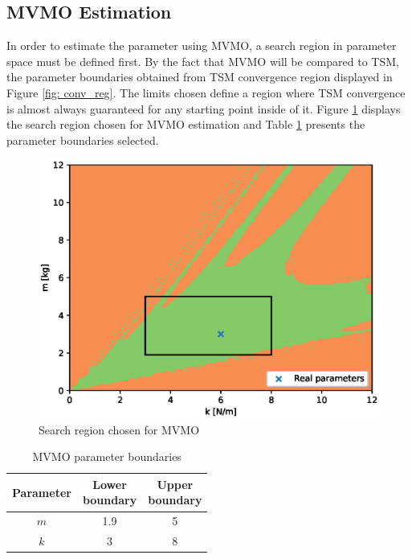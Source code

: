 \subsection{MVMO Estimation}

In order to estimate the parameter using MVMO, a search region in parameter space must be defined first. By the fact that MVMO will be compared to TSM, the parameter boundaries obtained from TSM convergence region displayed in Figure \ref{fig: conv_reg}. The limits chosen define a region where TSM convergence is almost always guaranteed for any starting point inside of it. Figure \ref{fig: spring_mass_MVMO_region} displays the search region chosen for MVMO estimation and Table \ref{tab: spring_mass_MVMO_bounds} presents the parameter boundaries selected.

\begin{figure}[h]
	\caption{Search region chosen for MVMO}
	\begin{center}
		\includegraphics[scale=0.6]{Images/mvmo_region.eps}
	\end{center}
	\label{fig: spring_mass_MVMO_region}
\end{figure}

\begin{table}[!h]
	\centering
	\caption{MVMO parameter boundaries}
	\begin{tabular}{c|cc}
		Parameter & \shortstack{Lower \\ boundary} & \shortstack{Upper \\ boundary} \\\hline
		$m$ & 1.9 & 5 \\
		$k$ & 3 & 8 \\
	\end{tabular}
	\label{tab: spring_mass_MVMO_bounds}
\end{table}

